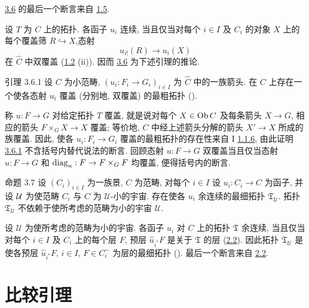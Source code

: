 \hyperref[III.prop3.6]{3.6} 的最后一个断言来自 \hyperref[III.prop1.5]{1.5}.

设 $T$ 为 $C$ 上的拓扑. 各函子 $u_i$ 连续, 当且仅当对每个 $i\in I$ 及
$C_i$ 的对象 $X$ 上的每个覆盖筛 $R\hookrightarrow X$,\pageoriginale{}态射
$$
u_{i!}(R)\longrightarrow u_i(X)
$$
在 $\widehat{C}$ 中双覆盖 (\hyperref[III.prop1.2]{1.2} (ii)).
因而 \hyperref[III.prop3.6]{3.6} 为下述引理的推论.

\begin{enonce*}{引理 3.6.1}
设 $C$ 为小范畴, $(u_i:F_i\rightarrow G_i)_{i\in I}$ 为 $\widehat{C}$ 中的一族箭头.
在 $C$ 上存在一个使各态射 $u_i$ 覆盖 (分别地, 双覆盖) 的最粗拓扑
{\rm()}.
\end{enonce*}

称 $u:F\rightarrow G$ 对给定拓扑 $T$ 覆盖,
就是说对每个 $X\in\operatorname{Ob} C$ 及每条箭头 $X\rightarrow G$,
相应的箭头 $F\times_G X\rightarrow X$ 覆盖;
等价地, $C$ 中经上述箭头分解的箭头 $X'\rightarrow X$ 所成的族覆盖.
因此, 使各 $u_i:F_i\rightarrow G_i$ 覆盖的最粗拓扑的存在性来自
I \hyperref[II.subsubsec1.1.6]{1.1.6},
由此证明 \hyperref[III.lem3.6.1]{3.6.1} 不含括号内替代说法的断言.
回顾态射 $u:F\rightarrow G$ 双覆盖当且仅当态射 $u:F\rightarrow G$
和 $\operatorname{diag}_u:F\rightarrow F\times_G F$ 均覆盖, 便得括号内的断言.

\begin{enonce*}{命题 3.7}
设 $(C_i)_{i\in I}$ 为一族景, $C$ 为范畴,
对每个 $i\in I$ 设 $u_i:C_i\rightarrow C$ 为函子,
并设 $\protect\mathcal{{\mathcal U}}$ 为使范畴 $C_i$ 与 $C$ 为 $𝒰$-小的宇宙.
存在使各 $u_i$ 余连续的最细拓扑 $\mathfrak{T}_{𝒰}$.
拓扑 $\mathfrak{T}_{𝒰}$ 不依赖于使所考虑的范畴为小的宇宙 $𝒰$.
\end{enonce*}

设 $𝒰$ 为使所考虑的范畴为小的宇宙.
各函子 $u_i$ 对 $C$ 上的拓扑 $\mathfrak{T}$ 余连续,
当且仅当对每个 $i\in I$ 及 $C_i$ 上的每个层 $F$,
预层 $\widehat{u}_{i^{\ast}}F$ 是关于 $\mathfrak{T}$ 的层
(\hyperref[III.prop2.2]{2.2}).
因此拓扑 $\mathfrak{T}_{𝒰}$ 是使各预层
$\widehat{u}_{i^\ast}F$, $i\in I$, $F\in C_i^{\sim}$ 为层的最细拓扑
().
最后一个断言来自 \hyperref[III.prop2.2]{2.2}.




\section{比较引理}\pageoriginale

